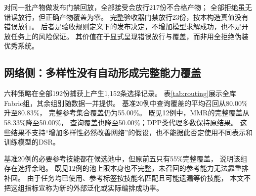 对同一批产物做发布门禁回放，全部接受会放行217份不合格产物；
全部拒绝虽无错误放行，但正确产物覆盖为零。
完整验收器门禁放行23份，按本构造真值没有错误放行。
后者是验收规则定义下的发布决定，不增加模型求解成功，也不是开放任务上的风险保证。
其价值在于显式呈现错误放行与覆盖，而非用全拒绝伪装优秀系统。

\subsection{网络侧：多样性没有自动形成完整能力覆盖}

六种策略在全部192份捕获上产生1,152条选择记录。
表\ref{tab:routing}展示全库Fabric组，其余组别随数据一并提供。
基准20例中查询覆盖的平均召回从80.00\%升至80.83\%，
完整参考集合覆盖仍为55.00\%。
既见12例中，MMR的完整覆盖从58.33\%降至50.00\%，
查询覆盖也降至50.00\%；DPP类代理多数保持原结果。
这些结果不支持“增加多样性必然改善网络”的假设，也不能据此否定使用不同表示和训练模型的DSR。

基准20例的必要参考技能都在候选池中，但原前五只有55\%完整覆盖，
说明该组存在选择余地。
既见12例的池上限本身也不完整，未召回的参考能力无法靠重排补回。
由于任务均已使用、参考标签按技能名匹配且可能遗漏等价技能，
本文不把这组指标宣称为新的外部泛化或实际编排成功率。
